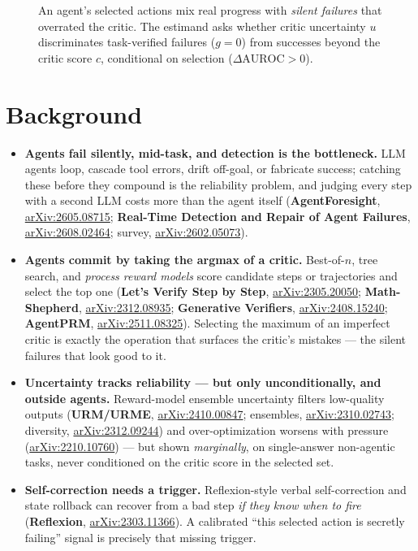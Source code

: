 \documentclass[11pt]{article}
\newcommand{\arxiv}[1]{\href{https://arxiv.org/abs/#1}{arXiv:#1}}
\begin{document}
\begin{figure}[t]
\caption{An agent's selected actions mix real progress with \emph{silent failures}
that overrated the critic. The estimand asks whether critic uncertainty $u$
discriminates task-verified failures ($g{=}0$) from successes beyond the critic
score $c$, conditional on selection ($\Delta\mathrm{AUROC}>0$).}
\label{fig:agent}
\end{figure}

\section{Background}
\begin{itemize}[leftmargin=1.2em,itemsep=3pt]
  \item \textbf{Agents fail silently, mid-task, and detection is the bottleneck.}
    LLM agents loop, cascade tool errors, drift off-goal, or fabricate success;
    catching these before they compound is the reliability problem, and judging
    every step with a second LLM costs more than the agent itself
    (\textbf{AgentForesight}, \arxiv{2605.08715}; \textbf{Real-Time Detection and
    Repair of Agent Failures}, \arxiv{2608.02464}; survey, \arxiv{2602.05073}).
  \item \textbf{Agents commit by taking the argmax of a critic.} Best-of-$n$, tree
    search, and \emph{process reward models} score candidate steps or trajectories
    and select the top one (\textbf{Let's Verify Step by Step}, \arxiv{2305.20050};
    \textbf{Math-Shepherd}, \arxiv{2312.08935}; \textbf{Generative Verifiers},
    \arxiv{2408.15240}; \textbf{AgentPRM}, \arxiv{2511.08325}). Selecting the
    maximum of an imperfect critic is exactly the operation that surfaces the
    critic's mistakes --- the silent failures that look good to it.
  \item \textbf{Uncertainty tracks reliability --- but only unconditionally, and
    outside agents.} Reward-model ensemble uncertainty filters low-quality outputs
    (\textbf{URM/URME}, \arxiv{2410.00847}; ensembles, \arxiv{2310.02743};
    diversity, \arxiv{2312.09244}) and over-optimization worsens with pressure
    (\arxiv{2210.10760}) --- but shown \emph{marginally}, on single-answer
    non-agentic tasks, never conditioned on the critic score in the selected set.
  \item \textbf{Self-correction needs a trigger.} Reflexion-style verbal
    self-correction and state rollback can recover from a bad step \emph{if they
    know when to fire} (\textbf{Reflexion}, \arxiv{2303.11366}). A calibrated
    ``this selected action is secretly failing'' signal is precisely that missing
    trigger.
\end{itemize}
\end{document}
